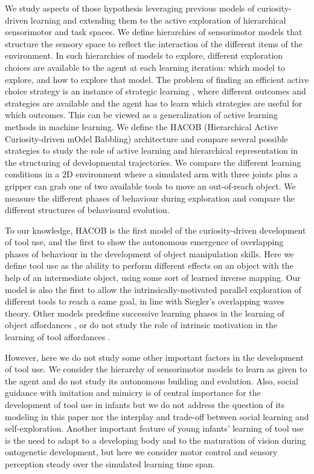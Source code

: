 \documentclass[10pt,letterpaper]{article}
\begin{document}
	We study aspects of those hypothesis leveraging previous models of curiosity-driven learning and extending them to the active exploration of hierarchical sensorimotor and task spaces.
	We define hierarchies of sensorimotor models that structure the sensory space to reflect the interaction of the different items of the environment.
	In such hierarchies of models to explore, different exploration choices are available to the agent at each learning iteration: which model to explore, and how to explore that model.
	The problem of finding an efficient active choice strategy is an instance of strategic learning \cite{nguyen2012}, 
	where different outcomes and strategies are available and the agent has to learn which strategies are useful for which outcomes. 
	This can be viewed as a generalization of active learning methods in machine learning.
	We define the HACOB (Hierarchical Active Curiosity-driven mOdel Babbling) architecture and compare several possible strategies 
	to study the role of active learning and hierarchical representation in the structuring of developmental trajectories.
	We compare the different learning conditions in a $2$D environment where a simulated arm with three joints plus a gripper can grab one of two available tools to move an out-of-reach object.
	We measure the different phases of behaviour during exploration and compare the different structures of behavioural evolution.
	
	To our knowledge, HACOB is the first model of the curiosity-driven development of tool use, 
	and the first to show the autonomous emergence of overlapping phases of behaviour in the development of object manipulation skills.
	Here we define  tool use as the ability to perform different effects on an object with the help of an intermediate object, using some sort of learned inverse mapping.
	Our model is also the first to allow the intrinsically-motivated parallel exploration of different tools to reach a same goal, in line with Siegler's overlapping waves theory.
	Other models predefine successive learning phases in the learning of object affordances \cite{ugur2015}, or do not study the role of intrinsic motivation in the learning of tool affordances \cite{stoytchev2005behavior}.
	
	However, here we do not study some other important factors in the development of tool use.
	We consider the hierarchy of sensorimotor models to learn as given to the agent and do not study its autonomous building and evolution.
	Also, social guidance with imitation and mimicry is of central importance for the development of tool use in infants but we do not address the question
	of its modeling in this paper nor the interplay and trade-off between social learning and self-exploration.
	Another important feature of young infants' learning of tool use is the need to adapt to a developing body and to the maturation of vision during ontogenetic development, 
	but here we consider motor control and sensory perception steady over the simulated learning time span.
\end{document}
